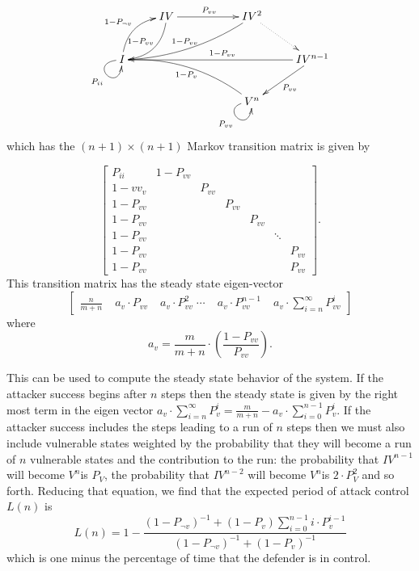 \documentclass{acm_proc_article-sp}
\begin{document}
\[
\xymatrix{ & {IV}\ar@/^{1pc}/[ld]_{\footnotesize{1-P_{vv}\!\!}}\ar[rr]^{\footnotesize{P_{vv}}} &  & {IV^{2}}\ar@/^{0.75pc}/@{-}[llld]_{\footnotesize{1-P_{vv}}}\ar@{.>}[dr]\\
{I}\ar@/^{1pc}/[ru]^{\footnotesize{1-P_{\neg v}}}\ar@(l,d)[]_{\footnotesize{P_{ii}}} &  &  &  & IV^{n-1}\ar[llll]_{\;\;\;\;\footnotesize{1-P_{vv}}}\ar[ld]^{\footnotesize{P_{vv}}}\\
 &  &  & {V^{n}}\ar@{-}@/_{1pc}/@{-}[lllu]^{\footnotesize{1-P_{v}}}\ar@(l,d)[]_{\footnotesize{P_{vv}}}
}
\]
which has the $(n+1)\times (n+1)$ Markov transition matrix is given by

\[
\left[\begin{array}{ccccccc}
P_{ii} & 1-P_{vv}\\
1-vv_{v} &  & P_{vv}\\
1-P_{vv} &  &  & P_{vv}\\
1-P_{vv} &  &  &  & P_{vv}\\
1-P_{vv} &  &  &  &  & \ddots\\
1-P_{vv} &  &  &  &  &  & P_{vv}\\
1-P_{vv} &  &  &  &  &  & P_{vv}
\end{array}\right]
.\]
This transition matrix has the steady state eigen-vector
{\small
\[
\left[\begin{array}{ccccc}
\frac{n}{m+n} & \; a_{v}\cdot P_{vv} & \; a_{v}\cdot P_{vv}^{2}\;\cdots  & \; a_{v}\cdot P_{vv}^{n-1} & \; a_{v}\cdot\sum_{i=n}^{\infty}P_{vv}^{i}\end{array}\right]
\]
}
where
\[
a_{v}=\frac{m}{m+n}\cdot\left(\frac{1-P_{vv}}{P_{vv}}\right).
\] 

This can be used to compute the steady state behavior of the system.
If the attacker success begins after $n$ steps then the steady state
is given by the right most term in the eigen vector $a_{v}\cdot\sum_{i=n}^{\infty}P_{v}^{i}=\frac{m}{m+n}-a_{v}\cdot\sum_{i=0}^{n-1}P_{v}^{i}$.
If the attacker success includes the steps leading to a run of $n$
steps then we must also include vulnerable states weighted by the
probability that they will become a run of $n$ vulnerable states
and the contribution to the run: the probability that $IV^{n-1}$ will
become $V^{n}$is $P_{V}$, the probability that $IV^{n-2}$ will become
$V^{n}$is $2\cdot P_{V}^{2}$ and so forth. Reducing that equation,
we find that the expected period of attack control $L(n)$ is 
\[
L(n)=1-\frac{\left(1-P_{\neg v}\right)^{-1}+\left(1-P_{v}\right)\sum_{i=0}^{n-1}i\cdot P_{v}^{i-1}}{\left(1-P_{\neg v}\right)^{-1}+\left(1-P_{v}\right)^{-1}}
\]
which is one minus the percentage of time that the defender is in control.
\end{document}
